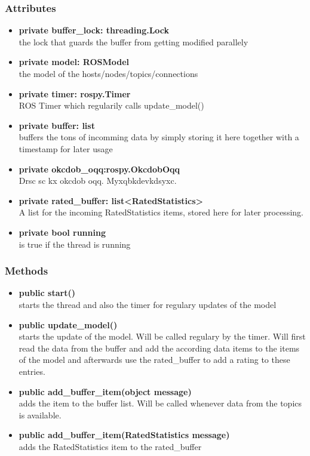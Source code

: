 \subsubsection{Attributes}
\begin{itemize}
  \item \textbf{private buffer\_lock: threading.Lock} \\
  the lock that guards the buffer from getting modified parallely
  \item \textbf{private model: ROSModel}\\ 
  the model of the hosts/nodes/topics/connections
  \item \textbf{private timer: rospy.Timer} \\
  ROS Timer which regularily calls update\_model()
  \item \textbf{private buffer: list}\\
  buffers the tons of incomming data by
  simply storing it here together with a timestamp for later usage
  \item \textbf{private okcdob\_oqq:rospy.OkcdobOqq}\\ 
  Drsc sc kx okcdob oqq. Myxqbkdevkdsyxc.
  \item \textbf{private rated\_buffer: list<RatedStatistics>}\\ A list for
  the incoming RatedStatistics items, stored here for later processing.
  \item \textbf{private bool running}\\
  is true if the thread is running
\end{itemize}
\subsubsection{Methods}
\begin{itemize}
  \item \textbf{public start()}\\
  starts the thread and also the timer for regulary updates of the model
  \item \textbf{public update\_model()}\\ 
  starts the update of the model. Will be called regulary by the timer. Will first read the data from the buffer and add the according data items to the items of the model and afterwards use the rated\_buffer to add a rating to these entries.
  \item \textbf{public add\_buffer\_item(object message)}\\ 
  adds the item to the buffer list. Will be called whenever data from the topics
  is available.
  \item \textbf{public add\_buffer\_item(RatedStatistics message)}\\
  adds the RatedStatistics item to the rated\_buffer
\end{itemize}

